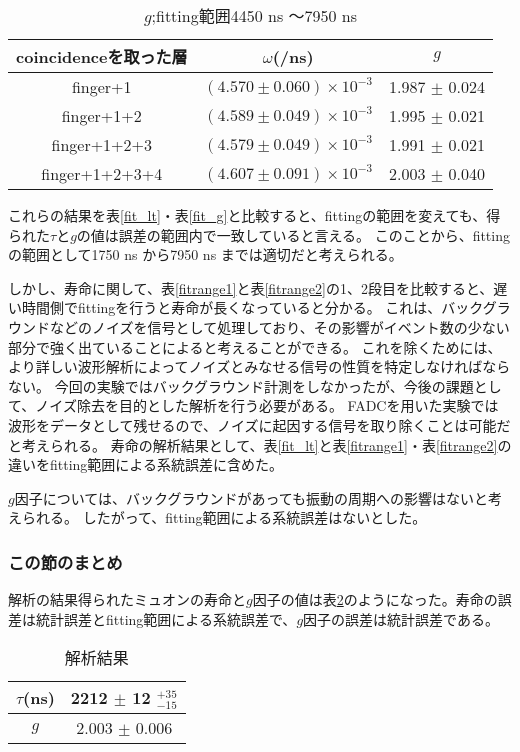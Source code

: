 \begin{table}[H]
\caption{$g$;fitting範囲4450 ns 〜7950 ns}
\label{fitrange4}
\begin{center}
\begin{tabular}{ccc}\toprule
coincidenceを取った層 	& $\omega$(/ns) 			& $g$ \\ \midrule
finger+1 		& $( 4.570 \pm 0.060 ) \times 10^{-3}$ 	& 1.987 $\pm$ 0.024 \\
finger+1+2 		& $( 4.589 \pm 0.049 ) \times 10^{-3}$ 	& 1.995 $\pm$ 0.021 \\
finger+1+2+3 		& $( 4.579 \pm 0.049 ) \times 10^{-3}$ 	& 1.991 $\pm$ 0.021 \\
finger+1+2+3+4 		& $( 4.607 \pm 0.091 ) \times 10^{-3}$ 	& 2.003 $\pm$ 0.040 \\ \bottomrule
\end{tabular}
\end{center}
\end{table}%

これらの結果を表\ref{fit_lt}・表\ref{fit_g}と比較すると、fittingの範囲を変えても、得られた$\tau$と$g$の値は誤差の範囲内で一致していると言える。
このことから、fittingの範囲として1750 ns から7950 ns までは適切だと考えられる。

しかし、寿命に関して、表\ref{fitrange1}と表\ref{fitrange2}の1、2段目を比較すると、遅い時間側でfittingを行うと寿命が長くなっていると分かる。
これは、バックグラウンドなどのノイズを信号として処理しており、その影響がイベント数の少ない部分で強く出ていることによると考えることができる。
これを除くためには、より詳しい波形解析によってノイズとみなせる信号の性質を特定しなければならない。
今回の実験ではバックグラウンド計測をしなかったが、今後の課題として、ノイズ除去を目的とした解析を行う必要がある。
FADCを用いた実験では波形をデータとして残せるので、ノイズに起因する信号を取り除くことは可能だと考えられる。
寿命の解析結果として、表\ref{fit_lt}と表\ref{fitrange1}・表\ref{fitrange2}の違いをfitting範囲による系統誤差に含めた。

$g$因子については、バックグラウンドがあっても振動の周期への影響はないと考えられる。
したがって、fitting範囲による系統誤差はないとした。

\subsubsection{この節のまとめ}
解析の結果得られたミュオンの寿命と$g$因子の値は表\ref{matome_ike}のようになった。寿命の誤差は統計誤差とfitting範囲による系統誤差で、$g$因子の誤差は統計誤差である。

\begin{table}[H]
\caption{解析結果}
\label{matome_ike}
\begin{center}
\begin{tabular}{cc}\toprule
$\tau$(ns) 	& 2212 $\pm$ 12 $^{ + 35}_{ - 15}$  \\ \midrule
$g$		& 2.003 $\pm$ 0.006 \\ \bottomrule
\end{tabular}
\end{center}
\end{table}%


%
